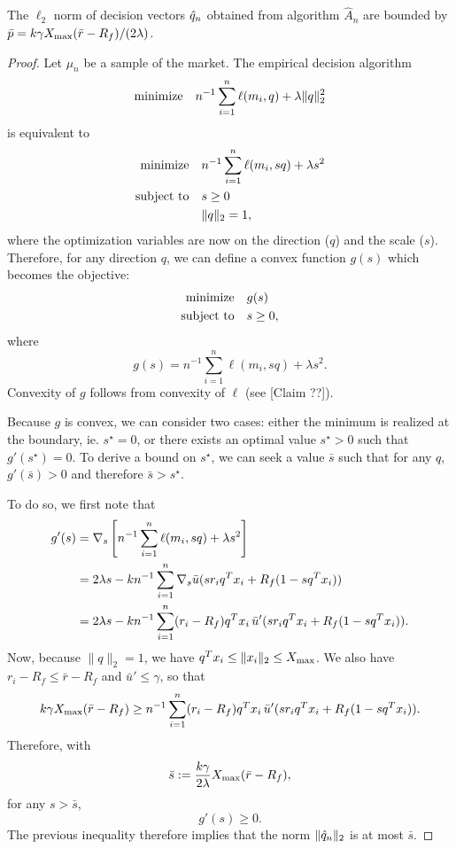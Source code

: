 \documentclass[11pt]{article}
\begin{document}
\begin{claim}
  \label{claim_p_bound}
  The $\ell_2$ norm of decision vectors ${\hat q}_n$ obtained from algorithm $\hat A_n$ are
  bounded by $\bar p = k\gamma X_{\max}(\bar r-R_f)/(2\lambda)$.
\end{claim}
\begin{proof}
  Let $\mu_n$ be a sample of the market. The empirical decision algorithm 
  \begin{equation*}
    \text{minimize} \quad {n^{-1}\sum_{i=1}^n\ell(m_i,q) + \lambda\|q\|^2_2}
  \end{equation*}
  is equivalent to 
  \begin{align*}
    \minimizeEquationSt{n^{-1}\sum_{i=1}^n \ell(m_i,sq) + \lambda s^2}[s\geq0\\,\|q\|_2=1],
  \end{align*}
  where the optimization variables are now on the direction ($q$) and the scale
  ($s$). Therefore, for any direction $q$, we can define a convex function $g(s)$ which
  becomes the objective:
  \begin{align*}
    \minimizeEquationSt{g(s)}[s\geq 0],
  \end{align*}
  where
  \begin{equation*}
    g(s) = n^{-1}\sum_{i=1}^n \ell(m_i, sq) + \lambda s^2.
  \end{equation*}
  Convexity of $g$ follows from convexity of $\ell$ (see [Claim ??]).

  
  Because $g$ is convex, we can consider two cases: either the minimum is realized at the
  boundary, ie. $s^\star=0$, or there exists an optimal value $s^\star > 0$ such that
  $g'(s^\star)=0$. To derive a bound on $s^\star$, we can seek a value $\bar s$ such
  that for any $q$, $g'(\bar s)>0$ and therefore $\bar s > s^\star$.

  To do so, we first note that 
  \begin{align*}
    g'(s) &= \nabla_s \left[n^{-1}\sum_{i=1}^n\ell(m_i,sq) + \lambda s^2\right]\\
          &= 2\lambda s - kn^{-1}\sum_{i=1}^n \nabla_s \bar u(sr_iq^Tx_i+R_f(1-sq^Tx_i))\\
          &= 2\lambda s - kn^{-1}\sum_{i=1}^n (r_i-R_f)q^Tx_i \, \bar u'(sr_iq^Tx_i+R_f(1-sq^Tx_i)).
  \end{align*}
  Now, because $\|q\|_2=1$, we have $q^Tx_i\leq\|x_i\|_2\leq X_{\max}$. We also have
  $r_i-R_f\leq \bar r-R_f$ and $\bar u'\leq\gamma$, so that
  \begin{equation*}
    k\gamma X_{\max}(\bar r-R_f) \geq n^{-1}\sum_{i=1}^n (r_i-R_f)q^Tx_i \, \bar u'(sr_iq^Tx_i+R_f(1-sq^Tx_i)).
  \end{equation*}
  Therefore, with
  \begin{equation*}
    \bar s := \frac{k\gamma}{2\lambda}X_{\max}(\bar r-R_f),
  \end{equation*}
  for any $s>\bar s$,
  \begin{equation*}
    g'(s) \geq 0.
  \end{equation*}
  The previous inequality therefore implies that the norm $\|{\hat q}_n\|_2$ is at most $\bar
  s$. 
\end{proof}
\end{document}
